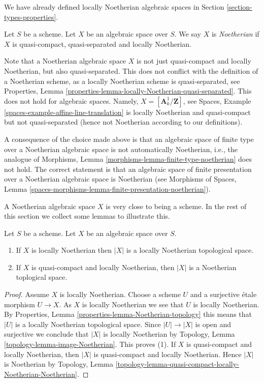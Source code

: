 \noindent
We have already defined locally Noetherian algebraic spaces in
Section \ref{section-types-properties}.

\begin{definition}
\label{definition-noetherian}
Let $S$ be a scheme. Let $X$ be an algebraic space over $S$.
We say $X$ is {\it Noetherian} if $X$ is quasi-compact, quasi-separated
and locally Noetherian.
\end{definition}

\noindent
Note that a Noetherian algebraic space $X$ is not just quasi-compact
and locally Noetherian, but also quasi-separated. This does not conflict
with the definition of a Noetherian scheme, as a locally Noetherian
scheme is quasi-separated, see
Properties, Lemma \ref{properties-lemma-locally-Noetherian-quasi-separated}.
This does not hold for algebraic spaces. Namely,
$X = [\mathbf{A}^1_k/\mathbf{Z}]$, see
Spaces, Example \ref{spaces-example-affine-line-translation}
is locally Noetherian and quasi-compact but not quasi-separated
(hence not Noetherian according to our definitions).

\medskip\noindent
A consequence of the choice made above is that an algebraic space
of finite type over a Noetherian algebraic space is not automatically
Noetherian, i.e., the analogue of
Morphisms, Lemma \ref{morphisms-lemma-finite-type-noetherian}
does not hold. The correct statement is that an algebraic space of
finite presentation over a Noetherian algebraic space is Noetherian
(see
Morphisms of Spaces,
Lemma \ref{spaces-morphisms-lemma-finite-presentation-noetherian}).

\medskip\noindent
A Noetherian algebraic space $X$ is very close to being a scheme.
In the rest of this section we collect some lemmas to illustrate this.

\begin{lemma}
\label{lemma-Noetherian-topology}
Let $S$ be a scheme. Let $X$ be an algebraic space over $S$.
\begin{enumerate}
\item If $X$ is locally Noetherian then $|X|$ is a locally Noetherian
topological space.
\item If $X$ is quasi-compact and locally Noetherian, then $|X|$
is a Noetherian toplogical space.
\end{enumerate}
\end{lemma}

\begin{proof}
Assume $X$ is locally Noetherian.
Choose a scheme $U$ and a surjective \'etale morphism
$U \to X$. As $X$ is locally Noetherian we see that $U$ is locally
Noetherian. By
Properties, Lemma \ref{properties-lemma-Noetherian-topology}
this means that $|U|$ is a locally Noetherian topological space.
Since $|U| \to |X|$ is open and surjective we conclude that
$|X|$ is locally Noetherian by
Topology, Lemma \ref{topology-lemma-image-Noetherian}.
This proves (1). If $X$ is quasi-compact and locally Noetherian,
then $|X|$ is quasi-compact and locally Noetherian. Hence $|X|$
is Noetherian by
Topology,
Lemma \ref{topology-lemma-quasi-compact-locally-Noetherian-Noetherian}.
\end{proof}

